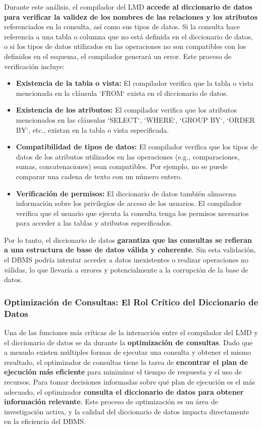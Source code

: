 Durante este análisis, el compilador del LMD \textbf{accede al diccionario de datos para verificar la validez de los nombres de las relaciones y los atributos} referenciados en la consulta, así como sus tipos de datos. Si la consulta hace referencia a una tabla o columna que no está definida en el diccionario de datos, o si los tipos de datos utilizados en las operaciones no son compatibles con los definidos en el esquema, el compilador generará un error.  Este proceso de verificación incluye:

\begin{itemize}
    \item \textbf{Existencia de la tabla o vista:}  El compilador verifica que la tabla o vista mencionada en la cláusula `FROM` exista en el diccionario de datos.
    \item \textbf{Existencia de los atributos:}  El compilador verifica que los atributos mencionados en las cláusulas `SELECT`, `WHERE`, `GROUP BY`, `ORDER BY`, etc., existan en la tabla o vista especificada.
    \item \textbf{Compatibilidad de tipos de datos:} El compilador verifica que los tipos de datos de los atributos utilizados en las operaciones (e.g., comparaciones, sumas, concatenaciones) sean compatibles.  Por ejemplo, no se puede comparar una cadena de texto con un número entero.
    \item \textbf{Verificación de permisos:} El diccionario de datos también almacena información sobre los privilegios de acceso de los usuarios.  El compilador verifica que el usuario que ejecuta la consulta tenga los permisos necesarios para acceder a las tablas y atributos especificados.
\end{itemize}

Por lo tanto, el diccionario de datos \textbf{garantiza que las consultas se refieran a una estructura de base de datos válida y coherente}. Sin esta validación, el DBMS podría intentar acceder a datos inexistentes o realizar operaciones no válidas, lo que llevaría a errores y potencialmente a la corrupción de la base de datos.

\subsubsection{Optimización de Consultas: El Rol Crítico del Diccionario de Datos}

Una de las funciones más críticas de la interacción entre el compilador del LMD y el diccionario de datos se da durante la \textbf{optimización de consultas}. Dado que a menudo existen múltiples formas de ejecutar una consulta y obtener el mismo resultado, el optimizador de consultas tiene la tarea de \textbf{encontrar el plan de ejecución más eficiente} para minimizar el tiempo de respuesta y el uso de recursos. Para tomar decisiones informadas sobre qué plan de ejecución es el más adecuado, el optimizador \textbf{consulta el diccionario de datos para obtener información relevante}.  Este proceso de optimización es un área de investigación activa, y la calidad del diccionario de datos impacta directamente en la eficiencia del DBMS.


